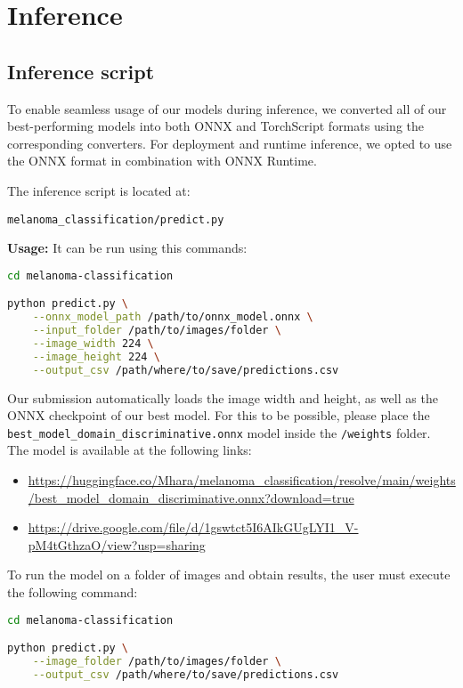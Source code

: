 \chapter{Inference}
\label{ch:inference}

\section{Inference script}
To enable seamless usage of our models during inference, we converted all of our best-performing models into both ONNX and TorchScript formats using the corresponding converters. For deployment and runtime inference, we opted to use the ONNX format in combination with ONNX Runtime.

The inference script is located at:

\begin{verbatim}
melanoma_classification/predict.py
\end{verbatim}


\textbf{Usage:}
It can be run using this commands:

\begin{lstlisting}[language=bash, caption={Run ONNX-based inference}, label={lst:onnx_inference}]
cd melanoma-classification

python predict.py \
    --onnx_model_path /path/to/onnx_model.onnx \
    --input_folder /path/to/images/folder \
    --image_width 224 \
    --image_height 224 \
    --output_csv /path/where/to/save/predictions.csv
\end{lstlisting}

Our submission automatically loads the image width and height, as well as the ONNX checkpoint of our best model. 
For this to be possible, please place the \texttt{best\_model\_domain\_discriminative.onnx} model inside the \texttt{/weights} folder. 
The model is available at the following links:
\begin{itemize}
    \item \url{https://huggingface.co/Mhara/melanoma_classification/resolve/main/weights/best_model_domain_discriminative.onnx?download=true}
    \item \url{https://drive.google.com/file/d/1gswtct5I6AIkGUgLYI1_V-pM4tGthzaO/view?usp=sharing}
\end{itemize}

To run the model on a folder of images and obtain results, the user must execute the following command:

\begin{lstlisting}[language=bash, caption={LUMEN submssion inference command}, label={lst:onnx_inference}]
cd melanoma-classification

python predict.py \
    --image_folder /path/to/images/folder \
    --output_csv /path/where/to/save/predictions.csv
\end{lstlisting}



